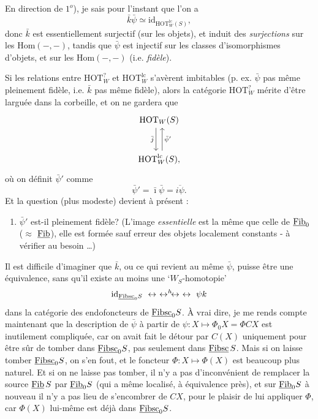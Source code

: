 En direction de $1^o$), je sais pour l'instant que l'on a
\[
\bar{k}\bar{\psi} \simeq \mathrm{id}_{\mathrm{HOT}^{\mathrm{lc}}_W(S)},
\]
donc $\bar{k}$ est essentiellement surjectif (sur les objets), et induit des \textit{surjections} sur les $\mathrm{Hom}(-,-)$, tandis que $\bar{\psi}$ est injectif sur les classes d'isomorphismes d'objets, et sur les $\mathrm{Hom}(-,-)$ (i.e. \textit{fidèle}).

Si les relations entre $\mathrm{HOT}^{?}_W$ et $\mathrm{HOT}^{\mathrm{lc}}_W$ s'avèrent imbitables (p. ex. $\bar{\psi}$ pas même pleinement fidèle, i.e. $\bar{k}$ pas même fidèle), alors la catégorie $\mathrm{HOT}^{?}_W$ mérite d'être larguée dans la corbeille, et on ne gardera que
\[
\begin{tikzcd}[row sep=large]
\mathrm{HOT}_W(S) \arrow[d, shift right=1.5, "\bar{j}"'] \\
\mathrm{HOT}^{\mathrm{lc}}_W(S), \arrow[u, shift right=1.5, "\bar{\psi}'"']
\end{tikzcd}
\]
où on définit $\bar{\psi}'$ comme
\[
\bar{\psi}' = \bar{\imath}\bar{\psi} = \overline{i\psi}.
\]
Et la question (plus modeste) devient à présent :

\begin{enumerate}[leftmargin=*]
\item[$3^o$)] $\bar{\psi}'$ est-il pleinement fidèle? (L'image \textit{essentielle} est la même que celle de $\underline{\mathrm{Fib}}_0$ ($\approx$ $\underline{\mathrm{Fib}}$), elle est formée sauf erreur des objets localement constants - à vérifier au besoin \dots)
\end{enumerate}


Il est difficile d'imaginer que $\bar{k}$, ou ce qui revient au même $\bar{\psi}$, puisse être une équivalence, sans qu'il existe au moins une `$W_S$-homotopie'
\[
\mathrm{id}_{\uu{Fibsc}_0 S} \ \leftrightarrow\ \leftrightarrow^{h}\!\leftrightarrow\ \leftrightarrow\ \psi k
\]
dans la catégorie des endofoncteurs de $\underline{\mathrm{Fibsc}}_0 S$. À vrai dire, je me rends compte maintenant que la description de $\bar{\psi}$ à partir de $\psi : X \longmapsto \Phi_0 X = \Phi C X$ est inutilement compliquée, car on avait fait le détour par $C(X)$ uniquement pour être sûr de tomber dans $\underline{\mathrm{Fibsc}}_0 S$, pas seulement dans $\underline{\mathrm{Fibsc}}\, S$. Mais si on laisse tomber $\underline{\mathrm{Fibsc}}_0 S$, on s'en fout, et le foncteur $\Phi : X \longmapsto \Phi(X)$ est beaucoup plus naturel. Et si on ne laisse pas tomber, il n'y a pas d'inconvénient de remplacer la source $\underline{\mathrm{Fib}}\, S$ par $\underline{\mathrm{Fib}}_0 S$ (qui a même localisé, à équivalence près), et sur $\underline{\mathrm{Fib}}_0 S$ à nouveau il n'y a pas lieu de s'encombrer de $CX$, pour le plaisir de lui appliquer $\Phi$, car $\Phi(X)$ lui-même est déjà dans $\underline{\mathrm{Fibsc}}_0 S$.

